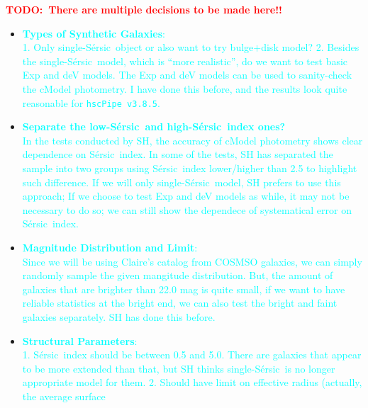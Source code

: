 \documentclass[preprint]{aastex}
\def\ser{{S\'{e}rsic\ }}
\newcommand{\todo}[1]{\textcolor{red}{\textbf{TODO:~#1}}}
\newcommand{\plan}[1]{\textcolor{cyan}{#1}}
\begin{document}
    \todo{\textbf{There are multiple decisions to be made here!!}}
    \begin{itemize}
        \item \plan{\textbf{Types of Synthetic Galaxies}: \\
                    1. Only single-\ser object or also want to try bulge$+$disk model? 
                    2. Besides the single-\ser model, which is ``more realistic'', do 
                       we want to test basic Exp and deV models.  
                       The Exp and deV models can be used to sanity-check the cModel 
                       photometry.  I have done this before, and the results look quite 
                       reasonable for \texttt{hscPipe\ v3.8.5}.}
        \item \plan{\textbf{Separate the low-\ser and high-\ser index ones?} \\
                    In the tests conducted by SH, the accuracy of cModel photometry shows
                    clear dependence on \ser index.  
                    In some of the tests, SH has separated the sample into two groups using
                    \ser index lower/higher than 2.5 to highlight such difference. 
                    If we will only single-\ser model, SH prefers to use this approach; 
                    If we choose to test Exp and deV models as while, it may not be necessary 
                    to do so; we can still show the dependece of systematical error on 
                    \ser index.}
        \item \plan{\textbf{Magnitude Distribution and Limit}: \\
                    Since we will be using Claire's catalog from COSMSO galaxies, we can 
                    simply randomly sample the given mangitude distribution.  
                    But, the amount of galaxies that are brighter than 22.0 mag is quite small, 
                    if we want to have reliable statistics at the bright end, we can also 
                    test the bright and faint galaxies separately.  SH has done this before. 
                   }
        \item \plan{\textbf{Structural Parameters}: \\
                    1. \ser index should be between 0.5 and 5.0.  
                       There are galaxies that appear to be more extended than that, 
                       but SH thinks single-\ser is no longer appropriate model for them.
                    2. Should have limit on effective radius (actually, the average surface 
}
\end{itemize}
\end{document}
